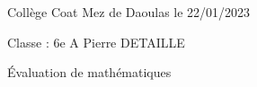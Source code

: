 \documentclass[a4paper,12pt,fleqn]{article}
\newcounter{exo}          				%
\begin{document}
\setcounter{exo}{0}


Collège Coat Mez de Daoulas  \hfill  le 22/01/2023

Classe : 6e A \hfill Pierre DETAILLE

\begin{center}
\begin{LARGE} Évaluation de mathématiques \end{LARGE}
\end{center}

\end{document}
